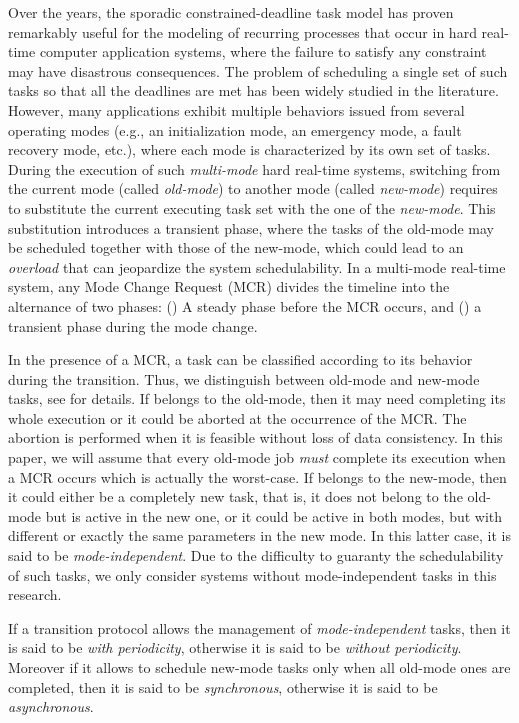 \documentclass[10pt,english,a4paper]{article}
\newtheorem{validity test}{Validity Test}
\begin{document}
Over the years, the sporadic constrained-deadline task model \cite{Baruah0} has proven remarkably useful for the modeling of recurring processes that occur in hard real-time computer application systems, where the failure to satisfy any constraint may have disastrous consequences. The problem of scheduling a single set of such tasks so that all the deadlines are met has been widely studied in the literature. However, many applications exhibit multiple behaviors issued from several operating modes (e.g., an initialization mode, an emergency mode, a fault recovery mode, etc.), where each mode is characterized by its own set of tasks. During the execution of such {\em multi-mode} hard real-time systems, switching from the current mode (called {\em old-mode}) to another mode (called {\em new-mode}) requires to substitute the current executing task set with the one of the {\em new-mode}. This substitution introduces a transient phase, where the tasks of the old-mode may be scheduled together with those of the new-mode, which could lead to an {\em overload} that can jeopardize the system schedulability. In a multi-mode real-time system, any Mode Change Request (MCR) divides the timeline into the alternance of two phases: () A steady phase before the MCR occurs, and () a transient phase during the mode change.

In the presence of a MCR, a task  can be classified according to its behavior during the transition. Thus, we distinguish between old-mode and new-mode tasks, see \cite{Pedro} for details. If  belongs to the old-mode, then it may need completing its whole execution or it could be aborted at the occurrence of the MCR. The abortion is performed when it is feasible without loss of data consistency. In this paper, we will assume that every old-mode job {\em must} complete its execution when a MCR occurs which is actually the worst-case. If  belongs to the new-mode, then it could either be a completely new task, that is, it does not belong to the old-mode but is active in the new one, or it could be active in both modes, but with different or exactly the same parameters in the new mode. In this latter  case, it is said to be {\em mode-independent}. Due to the difficulty to guaranty the schedulability of such tasks, we only consider systems without mode-independent tasks in this research. 

If a transition protocol allows the management of {\em mode-independent} tasks, then it is said to be {\em with periodicity}, otherwise it is said to be {\em without periodicity}. Moreover if it allows to schedule new-mode tasks only when all old-mode ones are completed, then it is said to be {\em synchronous}, otherwise it is said to be {\em asynchronous}. 
\end{document}
